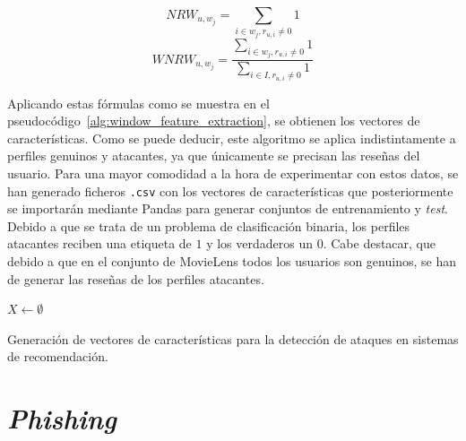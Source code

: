 \begin{equation}\label{eqn:NRW} NRW_{u, w_j} = \sum_{i\in w_j, r_{u,i} \ne 0}^{} 1 \end{equation}
\begin{equation}\label{eqn:WNRW} WNRW_{u, w_j} = \frac{\sum_{i\in w_j, r_{u,i} \ne 0}^{} 1}{\sum_{i\in I, r_{u,i} \ne 0}^{} 1} \end{equation}

Aplicando estas fórmulas como se muestra en el pseudocódigo~\ref{alg:window_feature_extraction}, se obtienen los vectores de características. Como se puede deducir, este algoritmo se aplica indistintamente a perfiles genuinos y atacantes, ya que únicamente se precisan las reseñas del usuario. Para una mayor comodidad a la hora de experimentar con estos datos, se han generado ficheros \texttt{.csv} con los vectores de características que posteriormente se importarán mediante Pandas para generar conjuntos de entrenamiento y \textit{test}. Debido a que se trata de un problema de clasificación binaria, los perfiles atacantes reciben una etiqueta de $1$ y los verdaderos un $0$. Cabe destacar, que debido a que en el conjunto de MovieLens todos los usuarios son genuinos, se han de generar las reseñas de los perfiles atacantes. 

\begin{algorithm}
	\BlankLine
	$X \leftarrow \emptyset$\\
	\caption{Generación de vectores de características para la detección de ataques en sistemas de recomendación.}
	\label{alg:window_feature_extraction}
\end{algorithm}


\section{\textit{Phishing}}

